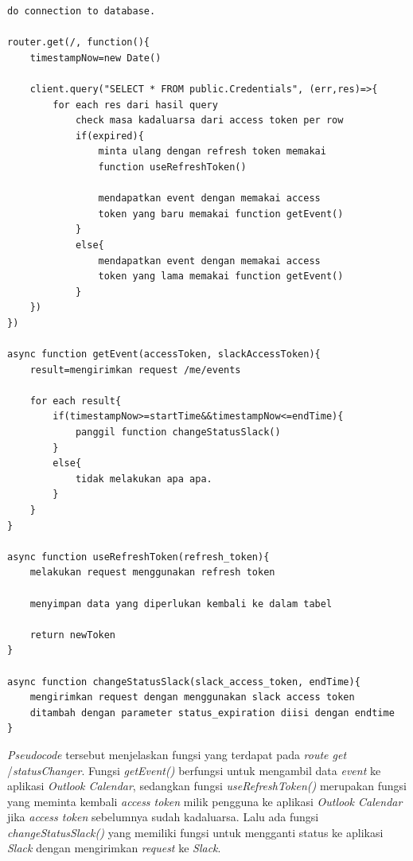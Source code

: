 \begin{lstlisting}[caption={Pseudocode untuk /statusChanger}, label={code:pseudocode_statusChanger}]
do connection to database. 

router.get(/, function(){
    timestampNow=new Date()
    
    client.query("SELECT * FROM public.Credentials", (err,res)=>{
        for each res dari hasil query
            check masa kadaluarsa dari access token per row
            if(expired){
                minta ulang dengan refresh token memakai
                function useRefreshToken()
                
                mendapatkan event dengan memakai access
                token yang baru memakai function getEvent()
            }
            else{
                mendapatkan event dengan memakai access
                token yang lama memakai function getEvent()
            }
    })
})

async function getEvent(accessToken, slackAccessToken){
    result=mengirimkan request /me/events
    
    for each result{
        if(timestampNow>=startTime&&timestampNow<=endTime){
            panggil function changeStatusSlack()
        }
        else{
            tidak melakukan apa apa. 
        }
    }
}

async function useRefreshToken(refresh_token){
    melakukan request menggunakan refresh token
    
    menyimpan data yang diperlukan kembali ke dalam tabel 
    
    return newToken
}

async function changeStatusSlack(slack_access_token, endTime){
    mengirimkan request dengan menggunakan slack access token
    ditambah dengan parameter status_expiration diisi dengan endtime
}

\end{lstlisting}

\textit{Pseudocode} tersebut menjelaskan fungsi yang terdapat pada \textit{route get} /\textit{statusChanger}. Fungsi \textit{getEvent()} berfungsi untuk mengambil data \textit{event} ke aplikasi \textit{Outlook Calendar}, sedangkan fungsi \textit{useRefreshToken()} merupakan fungsi yang meminta kembali \textit{access token} milik pengguna ke aplikasi \textit{Outlook Calendar} jika \textit{access token} sebelumnya sudah kadaluarsa. Lalu ada fungsi \textit{changeStatusSlack()} yang memiliki fungsi untuk mengganti status ke aplikasi \textit{Slack} dengan mengirimkan \textit{request} ke \textit{Slack}. 

